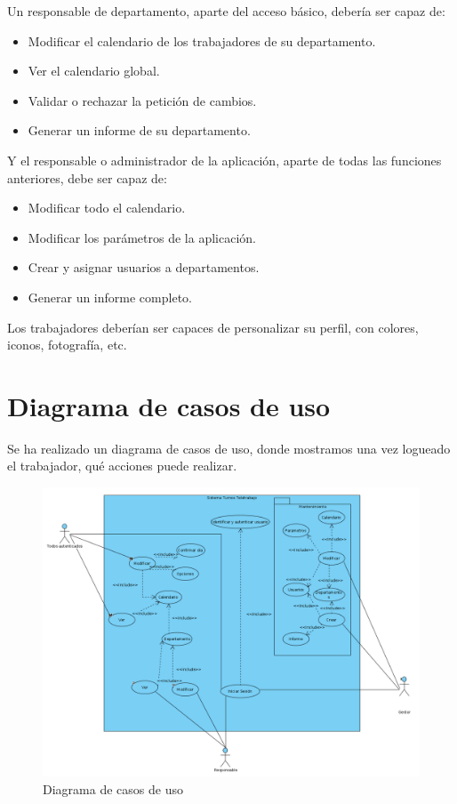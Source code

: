 \documentclass[11pt,spanish,listoffigures,listoftables]{tfgetsinf}
\begin{document}
Un responsable de departamento, aparte del acceso básico, debería ser capaz de:

\begin{itemize}
   \item Modificar el calendario de los trabajadores de su departamento.
   \item Ver el calendario global.
   \item Validar o rechazar la petición de cambios.
   \item Generar un informe de su departamento.
\end{itemize}

Y el responsable o administrador de la aplicación, aparte de todas las funciones anteriores, debe ser capaz de:

\begin{itemize}
   \item Modificar todo el calendario.
   \item Modificar los parámetros de la aplicación.
   \item Crear y asignar usuarios a departamentos.
   \item Generar un informe completo.
\end{itemize}

Los trabajadores deberían ser capaces de personalizar su perfil, con colores, iconos, fotografía, etc.

\section{Diagrama de casos de uso}

Se ha realizado un diagrama de casos de uso, donde mostramos una vez logueado el trabajador, qué acciones puede realizar.

\begin{figure}[h!] %
   \includegraphics[width=\linewidth]{img/Casos de uso.png}
   \caption{Diagrama de casos de uso}
   \label{fig:CasosUso1}
 \end{figure}
\end{document}
